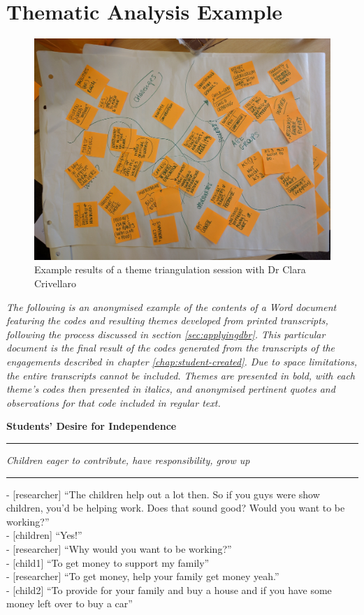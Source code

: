 \section{Thematic Analysis Example}
\label{app:analysisexample}

\begin{figure}
  \centering
  \includegraphics[width=0.8\columnwidth]{images/appendix/clara.jpg}
  \caption{Example results of a theme triangulation session with Dr Clara Crivellaro}
  \label{app:triangulationexample}
\end{figure}


\textit{The following is an anonymised example of the contents of a Word document featuring the codes and resulting themes developed from printed transcripts, following the process discussed in section \ref{sec:applyingdbr}. This particular document is the final result of the codes generated from the transcripts of the engagements described in chapter \ref{chap:student-created}. Due to space limitations, the entire transcripts cannot be included. Themes are presented in bold, with each theme's codes then presented in italics, and anonymised pertinent quotes and observations for that code included in regular text.}

\vspace{5mm}

\textbf{Students’ Desire for Independence}

\par\noindent\rule{\textwidth}{1pt}

\textit{Children eager to contribute, have responsibility, grow up}

\par\noindent\rule{\textwidth}{1pt}

- [researcher] “The children help out a lot then. So if you guys were show children, you’d be helping work. Does that sound good? Would you want to be working?” \\
- [children] “Yes!”\\
- [researcher] “Why would you want to be working?”\\
- [child1] “To get money to support my family”\\
- [researcher] “To get money, help your family get money yeah.”\\
- [child2] “To provide for your family and buy a house and if you have some money left over to buy a car”

